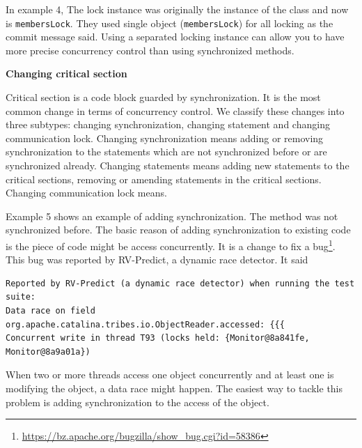 
In example 4, The lock instance was originally the instance of the class and now is \texttt{membersLock}. They used single object (\texttt{membersLock}) for all locking as the commit message said. Using a separated locking instance can allow you to have more precise concurrency control than using synchronized methods.

\textbf{Changing critical section}

Critical section is a code block guarded by synchronization. It is the most common change in terms of concurrency control. We classify these changes into three subtypes: changing synchronization, changing statement and changing communication lock. Changing synchronization means adding or removing synchronization to the statements which are not synchronized before or are synchronized already. Changing statements means adding new statements to the critical sections, removing or amending statements in the critical sections. Changing communication lock means. %


Example 5 shows an example of adding synchronization. The method was not synchronized before. The basic reason of adding synchronization to existing code is the piece of code might be access concurrently. It is a change to fix a bug\footnote{\url{https://bz.apache.org/bugzilla/show\_bug.cgi?id=58386}}. This bug was reported by RV-Predict, a dynamic race detector. It said

\begin{lstlisting}
Reported by RV-Predict (a dynamic race detector) when running the test suite:
Data race on field org.apache.catalina.tribes.io.ObjectReader.accessed: {{{
Concurrent write in thread T93 (locks held: {Monitor@8a841fe, Monitor@8a9a01a})
\end{lstlisting}

When two or more threads access one object concurrently and at least one is modifying the object, a data race might happen. The easiest way to tackle this problem is adding synchronization to the access of the object.


